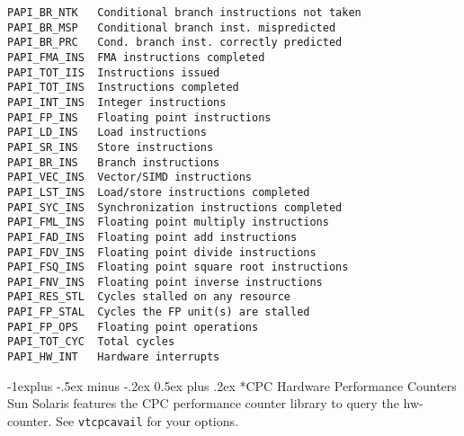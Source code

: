 \documentclass[a4paper,10pt,landscape]{article}
\makeatletter
\renewcommand{\subsection}{\@startsection{subsection}{2}{0mm}%
                                {-1explus -.5ex minus -.2ex}%
                                {0.5ex plus .2ex}%
                                {\normalfont\normalsize\bfseries}}
\makeatother
\begin{document}
\begin{multicols}{3}
\begin{scriptsize}
\begin{verbatim}
PAPI_BR_NTK   Conditional branch instructions not taken           
PAPI_BR_MSP   Conditional branch inst. mispredicted        
PAPI_BR_PRC   Cond. branch inst. correctly predicted 
PAPI_FMA_INS  FMA instructions completed                          
PAPI_TOT_IIS  Instructions issued                                 
PAPI_TOT_INS  Instructions completed                              
PAPI_INT_INS  Integer instructions                                
PAPI_FP_INS   Floating point instructions                         
PAPI_LD_INS   Load instructions                                   
PAPI_SR_INS   Store instructions                                  
PAPI_BR_INS   Branch instructions                                 
PAPI_VEC_INS  Vector/SIMD instructions                            
PAPI_LST_INS  Load/store instructions completed                   
PAPI_SYC_INS  Synchronization instructions completed              
PAPI_FML_INS  Floating point multiply instructions                
PAPI_FAD_INS  Floating point add instructions                     
PAPI_FDV_INS  Floating point divide instructions                  
PAPI_FSQ_INS  Floating point square root instructions             
PAPI_FNV_INS  Floating point inverse instructions                 
PAPI_RES_STL  Cycles stalled on any resource    
PAPI_FP_STAL  Cycles the FP unit(s) are stalled 
PAPI_FP_OPS   Floating point operations         
PAPI_TOT_CYC  Total cycles                      
PAPI_HW_INT   Hardware interrupts               
\end{verbatim} 
\end{scriptsize}



\subsection*{CPC Hardware Performance Counters}
Sun Solaris features the CPC performance counter library to query the hw-counter. See \texttt{vtcpcavail} for your options.


\end{multicols}
\end{document}
